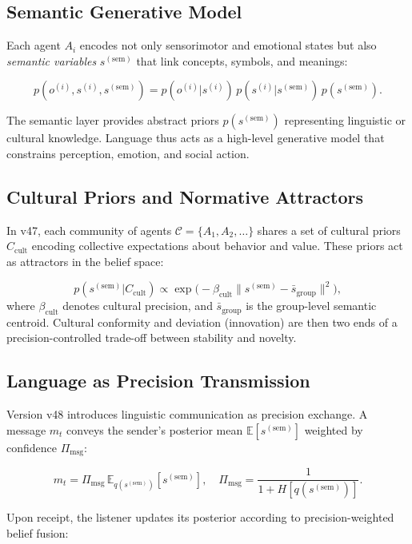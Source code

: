\documentclass[9pt]{elife}
\begin{document}
\subsection{Semantic Generative Model}

Each agent $A_i$ encodes not only sensorimotor and emotional states
but also \emph{semantic variables} $s^{(\mathrm{sem})}$ that link
concepts, symbols, and meanings:

\[
p(o^{(i)}, s^{(i)}, s^{(\mathrm{sem})}) =
p(o^{(i)}|s^{(i)}) \,
p(s^{(i)}|s^{(\mathrm{sem})}) \,
p(s^{(\mathrm{sem})}).
\]

The semantic layer provides abstract priors $p(s^{(\mathrm{sem})})$
representing linguistic or cultural knowledge.
Language thus acts as a high-level generative model
that constrains perception, emotion, and social action.

\subsection{Cultural Priors and Normative Attractors}

In v47, each community of agents $\mathcal{C} = \{A_1, A_2, \dots\}$
shares a set of cultural priors $C_{\mathrm{cult}}$
encoding collective expectations about behavior and value.
These priors act as attractors in the belief space:

\[
p(s^{(\mathrm{sem})}|C_{\mathrm{cult}}) \propto
\exp\!\big(-\beta_{\mathrm{cult}} \|s^{(\mathrm{sem})} - \bar{s}_{\mathrm{group}}\|^2\big),
\]
where $\beta_{\mathrm{cult}}$ denotes cultural precision,
and $\bar{s}_{\mathrm{group}}$ is the group-level semantic centroid.
Cultural conformity and deviation (innovation) are then
two ends of a precision-controlled trade-off between stability and novelty.

\subsection{Language as Precision Transmission}

Version v48 introduces linguistic communication as precision exchange.
A message $m_t$ conveys the sender’s posterior mean
$\mathbb{E}[s^{(\mathrm{sem})}]$ weighted by confidence $\Pi_{\mathrm{msg}}$:

\[
m_t = \Pi_{\mathrm{msg}} \, \mathbb{E}_{q(s^{(\mathrm{sem})})}[s^{(\mathrm{sem})}],
\quad
\Pi_{\mathrm{msg}} = \frac{1}{1 + H[q(s^{(\mathrm{sem})})]}.
\]

Upon receipt, the listener updates its posterior according to
precision-weighted belief fusion:
\end{document}
